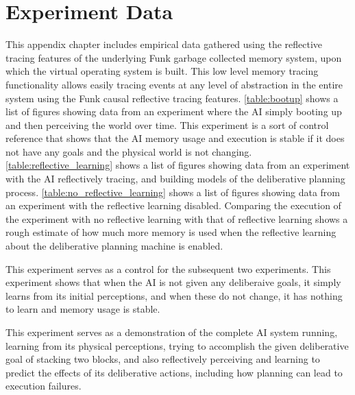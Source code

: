 \chapter{Experiment Data}
\label{chapter:experiment_data}

This appendix chapter includes empirical data gathered using the
reflective tracing features of the underlying Funk garbage collected
memory system, upon which the virtual operating system is built.  This
low level memory tracing functionality allows easily tracing events at
any level of abstraction in the entire system using the Funk causal
reflective tracing features.  \autoref{table:bootup} shows a list of
figures showing data from an experiment where the AI simply booting up
and then perceiving the world over time.  This experiment is a sort of
control reference that shows that the AI memory usage and execution is
stable if it does not have any goals and the physical world is not
changing.  \autoref{table:reflective_learning} shows a list of figures
showing data from an experiment with the AI reflectively tracing, and
building models of the deliberative planning process.
\autoref{table:no_reflective_learning} shows a list of figures showing
data from an experiment with the reflective learning disabled.
Comparing the execution of the experiment with no reflective learning
with that of reflective learning shows a rough estimate of how much
more memory is used when the reflective learning about the
deliberative planning machine is enabled.

 {This experiment serves as a
  control for the subsequent two experiments.  This experiment shows
  that when the AI is not given any deliberaive goals, it simply
  learns from its initial perceptions, and when these do not change,
  it has nothing to learn and memory usage is stable.}

 {This experiment serves as a demonstration of the
  complete AI system running, learning from its physical perceptions,
  trying to accomplish the given deliberative goal of stacking two
  blocks, and also reflectively perceiving and learning to predict the
  effects of its deliberative actions, including how planning can lead
  to execution failures.}

